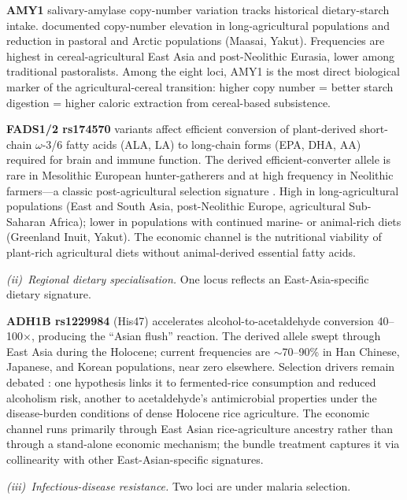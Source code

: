 \documentclass[11pt,letterpaper]{article}
\begin{document}
\textbf{AMY1} salivary-amylase copy-number variation tracks historical dietary-starch intake. \citet{perry2007} documented copy-number elevation in long-agricultural populations and reduction in pastoral and Arctic populations (Maasai, Yakut). Frequencies are highest in cereal-agricultural East Asia and post-Neolithic Eurasia, lower among traditional pastoralists. Among the eight loci, AMY1 is the most direct biological marker of the agricultural-cereal transition: higher copy number = better starch digestion = higher caloric extraction from cereal-based subsistence.

\textbf{FADS1/2 rs174570} variants affect efficient conversion of plant-derived short-chain $\omega$-3/6 fatty acids (ALA, LA) to long-chain forms (EPA, DHA, AA) required for brain and immune function. The derived efficient-converter allele is rare in Mesolithic European hunter-gatherers and at high frequency in Neolithic farmers---a classic post-agricultural selection signature \citep{ameur2012,mathieson2015}. High in long-agricultural populations (East and South Asia, post-Neolithic Europe, agricultural Sub-Saharan Africa); lower in populations with continued marine- or animal-rich diets (Greenland Inuit, Yakut). The economic channel is the nutritional viability of plant-rich agricultural diets without animal-derived essential fatty acids.

\emph{(ii)~Regional dietary specialisation.} One locus reflects an East-Asia-specific dietary signature.

\textbf{ADH1B rs1229984} (His47) accelerates alcohol-to-acetaldehyde conversion 40--100$\times$, producing the ``Asian flush'' reaction. The derived allele swept through East Asia during the Holocene; current frequencies are $\sim$70--90\% in Han Chinese, Japanese, and Korean populations, near zero elsewhere. Selection drivers remain debated \citep{peng2010}: one hypothesis links it to fermented-rice consumption and reduced alcoholism risk, another to acetaldehyde's antimicrobial properties under the disease-burden conditions of dense Holocene rice agriculture. The economic channel runs primarily through East Asian rice-agriculture ancestry rather than through a stand-alone economic mechanism; the bundle treatment captures it via collinearity with other East-Asian-specific signatures.

\emph{(iii)~Infectious-disease resistance.} Two loci are under malaria selection.
\end{document}
